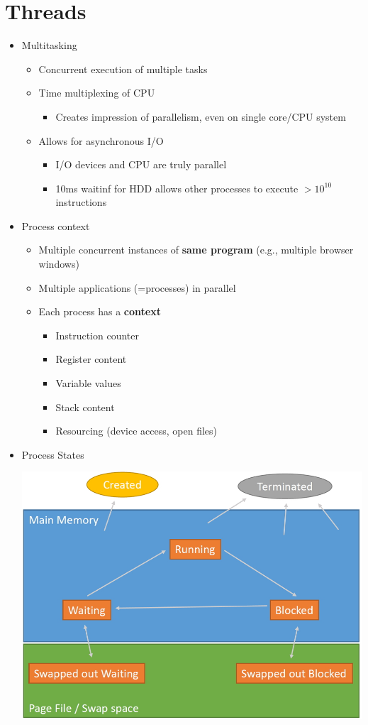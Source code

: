 \documentclass[a4paper]{article}
\begin{document}
\section{Threads}
	\begin{itemize}
		\item Multitasking
			\begin{itemize}
				\item Concurrent execution of multiple tasks
				\item Time multiplexing of CPU
					\begin{itemize}
						\item Creates impression of parallelism, even on single core/CPU system
					\end{itemize}
				\item Allows for asynchronous I/O
					\begin{itemize}
						\item I/O devices and CPU are truly parallel
						\item 10ms waitinf for HDD allows other processes to execute $>10^{10}$ instructions
					\end{itemize}
			\end{itemize}
		\item Process context
			\begin{itemize}
				\item Multiple concurrent instances of \textbf{same program} (e.g., multiple browser windows)
				\item Multiple applications (=processes) in parallel
				\item Each process has a \textbf{context}
					\begin{itemize}
						\item Instruction counter
						\item Register content
						\item Variable values
						\item Stack content
						\item Resourcing (device access, open files)
					\end{itemize}
			\end{itemize}
		\item Process States\\
		\begin{center}
		\includegraphics[scale=1]{Figures/ProcessState2.jpg}

\end{center}
\end{itemize}
\end{document}
